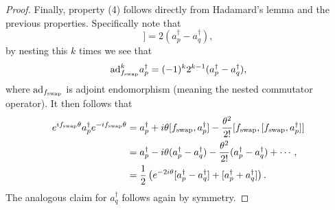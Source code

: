 \documentclass[superscriptaddress,aps,pra,nofootinbib,notitlepage,10pt,longbibliography]{revtex4-1}
\begin{document}
\begin{proof}
Finally, property (4) follows directly from Hadamard's lemma and the previous properties.  Specifically note that
\begin{equation}
[f_{\rm swap},[f_{\rm swap},a_p^\dagger]]= 2(a_p^\dagger - a_q^\dagger),
\end{equation}
by nesting this $k$ times we see that
\begin{equation}
{\rm ad}_{f_{\rm swap}}^k a_p^\dagger = (-1)^k2^{k-1}(a_p^\dagger -a_q^\dagger),
\end{equation}
where ${\rm ad}_{f_{\rm swap}}$ is adjoint endomorphism (meaning the nested commutator operator).  It then follows that
\begin{align}
e^{if_{\rm swap} \theta} a_p^\dagger e^{-if_{\rm swap} \theta}&= a_p^\dagger +i\theta [f_{\rm swap},a_p^\dagger]-\frac{\theta^2}{2!}[f_{\rm swap},[f_{\rm swap},a_p^\dagger]]\\
&=a_p^\dagger -i\theta (a_p^\dagger -a_q^\dagger) -\frac{\theta^2}{2!}(a_p^\dagger -a_q^\dagger) +\cdots,\nonumber\\
&=\frac{1}{2}\left(e^{-2i\theta}[a_p^\dagger - a_q^\dagger] + [a_p^\dagger +a_q^\dagger] \right).\nonumber
\end{align}
The analogous claim for $a_q^\dagger$ follows again by symmetry.
\end{proof}
\end{document}
